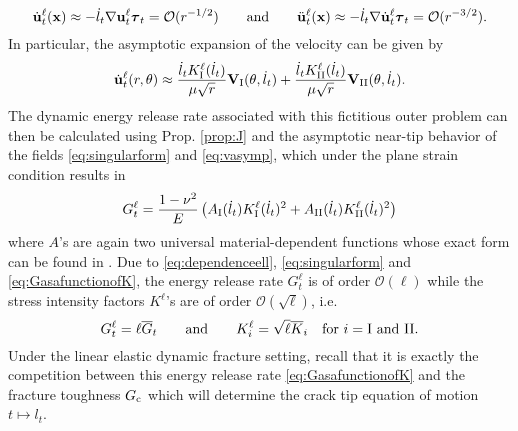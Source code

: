 \begin{equation} \label{eq:steadystatecondition}
\dot{\vec{u}}_t^\ell(\vec{x})\approx -\dot{l}_t\nabla\vec{u}_t^\ell\vtau_t=\mathcal{O}(r^{-1/2})\qquad\text{and}\qquad\ddot{\vec{u}}_t^\ell(\vec{x})\approx -\dot{l}_t\nabla\dot{\vec{u}}_t^\ell\vtau_t=\mathcal{O}(r^{-3/2}).
\end{equation}
In particular, the asymptotic expansion of the velocity can be given by
\begin{equation} \label{eq:vasymp}
\dot{\vec{u}}_t^\ell(r,\theta)\approx\frac{\dot{l}_tK_\RN{1}^\ell(\dot{l}_t)}{\mu\sqrt{r}}\vec{V}_\RN{1}(\theta,\dot{l}_t)+\frac{\dot{l}_tK_\RN{2}^\ell(\dot{l}_t)}{\mu\sqrt{r}}\vec{V}_\RN{2}(\theta,\dot{l}_t).
\end{equation}
The dynamic energy release rate associated with this fictitious outer problem can then be calculated using Prop. \ref{prop:J} and the asymptotic near-tip behavior of the fields \eqref{eq:singularform} and \eqref{eq:vasymp}, which under the plane strain condition results in
\begin{equation} \label{eq:GasafunctionofK}
G_t^\ell=\frac{1-\nu^2}{E}\left(A_\RN{1}(\dot{l}_t)K_\RN{1}^\ell(\dot{l}_t)^2+A_\RN{2}(\dot{l}_t)K_\RN{2}^\ell(\dot{l}_t)^2\right)
\end{equation}
where $A$'s are again two universal material-dependent functions whose exact form can be found in  \cite{Freund:1990}. Due to \eqref{eq:dependenceell}, \eqref{eq:singularform} and \eqref{eq:GasafunctionofK}, the energy release rate $G_t^\ell$ is of order $\mathcal{O}(\ell)$ while the stress intensity factors $K^\ell$'s are of order $\mathcal{O}(\sqrt{\ell})$, i.e.
\begin{equation} \label{eq:Gtell}
G_t^\ell=\ell\overline{G}_t\qquad\text{and}\qquad K_i^\ell=\sqrt{\ell}\overline{K}_i\quad\text{for $i=\RN{1}$ and \RN{2}}.
\end{equation}
Under the linear elastic dynamic fracture setting, recall that it is exactly the competition between this energy release rate \eqref{eq:GasafunctionofK} and the fracture toughness $G_\mathrm{c}$ which will determine the crack tip equation of motion $t\mapsto l_t$.

